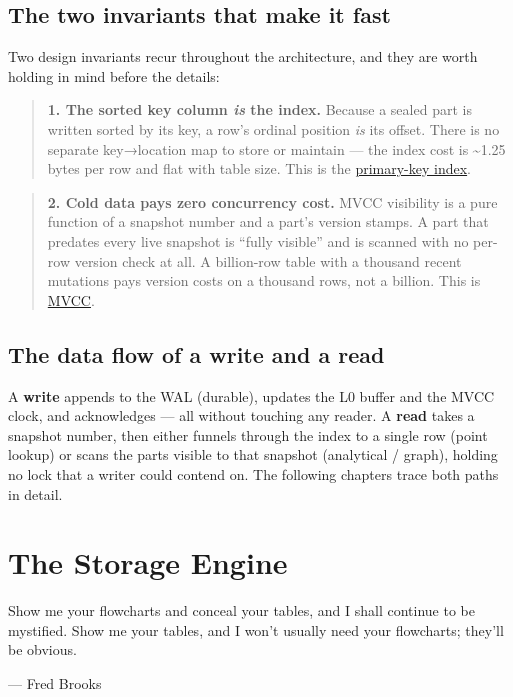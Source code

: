 \documentclass[
  11pt,
  openany]{book}
\begin{document}
\section{The two invariants that make it
fast}\label{the-two-invariants-that-make-it-fast}

Two design invariants recur throughout the architecture, and they are
worth holding in mind before the details:

\begin{quote}
\textbf{1. The sorted key column \emph{is} the index.} Because a sealed
part is written sorted by its key, a row's ordinal position \emph{is}
its offset. There is no separate key→location map to store or maintain
--- the index cost is \textasciitilde1.25 bytes per row and flat with
table size. This is the \href{storage.md}{primary-key index}.
\end{quote}

\begin{quote}
\textbf{2. Cold data pays zero concurrency cost.} MVCC visibility is a
pure function of a snapshot number and a part's version stamps. A part
that predates every live snapshot is ``fully visible'' and is scanned
with no per-row version check at all. A billion-row table with a
thousand recent mutations pays version costs on a thousand rows, not a
billion. This is \href{mvcc.md}{MVCC}.
\end{quote}

\section{The data flow of a write and a
read}\label{the-data-flow-of-a-write-and-a-read}

A \textbf{write} appends to the WAL (durable), updates the L0 buffer and
the MVCC clock, and acknowledges --- all without touching any reader. A
\textbf{read} takes a snapshot number, then either funnels through the
index to a single row (point lookup) or scans the parts visible to that
snapshot (analytical / graph), holding no lock that a writer could
contend on. The following chapters trace both paths in detail.

\chapter{The Storage Engine}\label{the-storage-engine}

\epigraph{Show me your flowcharts and conceal your tables, and I shall continue to be mystified. Show me your tables, and I won't usually need your flowcharts; they'll be obvious.}{--- Fred Brooks}
\end{document}
